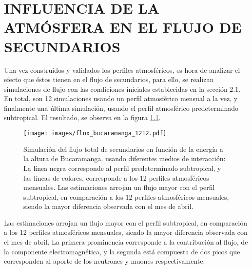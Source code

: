 
\newpage

\chapter{INFLUENCIA DE LA ATMÓSFERA EN EL FLUJO DE SECUNDARIOS}

Una vez construidos y validados los perfiles atmosféricos, es hora de analizar el efecto que éstos tienen en el flujo de secundarios, para ello, se realizan simulaciones de flujo con las condiciones iniciales establecidas en la sección 2.1. En total, son 12 simulaciones usando un perfil atmosférico mensual a la vez, y finalmente una última simulación, usando el perfil atmosférico predeterminado subtropical. El resultado, se observa en la figura \ref{fig:fig19}.\\

\begin{figure}[htb!]
\centering
\texttt{[image: images/flux\_bucaramanga\_1212.pdf]}
\caption[Flujo de secundarios en función de la energía a la altura de Bucaramanga.]{Simulación del flujo total de secundarios en función de la energía a la altura de Bucaramanga, usando diferentes medios de interacción: La línea negra corresponde al perfil predeterminado subtropical, y las líneas de colores, corresponde a los 12 perfiles atmosféricos mensuales. Las estimaciones arrojan un flujo mayor con el perfil subtropical, en comparación a los 12 perfiles atmosféricos mensuales, siendo la mayor diferencia observada con el mes de abril.}
\label{fig:fig19}
\end{figure}
Las estimaciones arrojan un flujo mayor con el perfil subtropical, en comparación a los 12 perfiles atmosféricos mensuales, siendo la mayor diferencia observada con el mes de abril. La primera prominencia corresponde a la contribución al flujo, de la componente electromagnética, y la segunda está compuesta de dos picos que corresponden al aporte de los neutrones y muones respectivamente.\\ 

